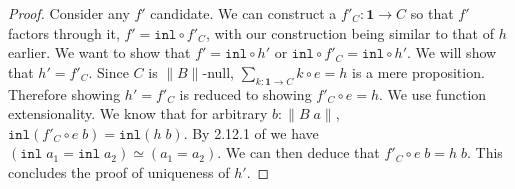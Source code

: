 \documentclass[12pt]{report}
\begin{document}
\begin{proof}
Consider any $f'$ candidate. 
We can construct a $f'_C : \mathbf{1} \rightarrow C$ so that $f'$ factors through it, $f' = \mathtt{inl} \circ f'_C$, with our construction being similar to that of $h$ earlier. 
We want to show that $f' = \mathtt{inl} \circ h'$ or $\mathtt{inl} \circ f'_C = \mathtt{inl} \circ h'$. 
We will show that $h' = f'_C$. 
Since $C$ is $\lVert B \rVert$-null, $\sum_{k : \mathbf{1} \rightarrow C} k \circ e = h$ is a mere proposition. 
Therefore showing $h' = f'_C$ is reduced to showing $f'_C \circ e = h$. 
We use function extensionality. 
We know that for arbitrary $b : \lVert B\; a \rVert$, $\mathtt{inl} (f'_C \circ e\; b ) = \mathtt{inl} (h\; b)$. 
By 2.12.1 of \cite{hottbook} we have $(\mathtt{inl}\; a_1 = \mathtt{inl}\; a_2) \simeq (a_1 = a_2)$. 
We can then deduce that $f'_C\circ e\; b = h\; b$. This concludes the proof of uniqueness of $h'$.

\end{proof}

\printbibliography
\end{document}
